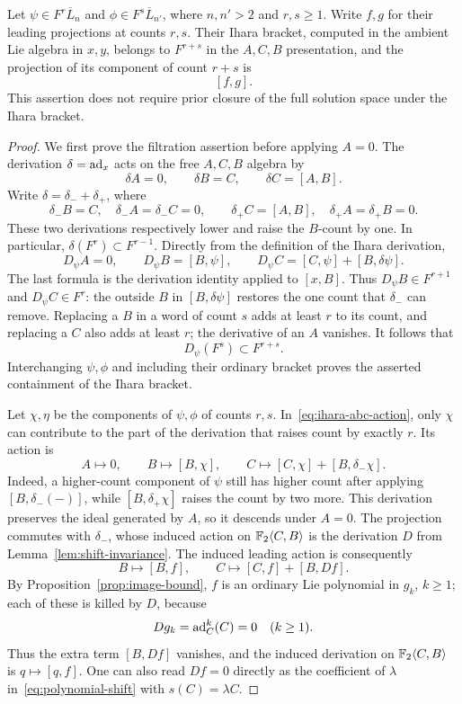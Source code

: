 \begin{proposition}
\label{prop:leading-ihara}
Let $\psi\in F^r\overline L_n$ and
$\phi\in F^s\overline L_{n'}$, where $n,n'>2$ and $r,s\geq1$.
Write $f,g$ for their leading projections at counts $r,s$.
Their Ihara bracket, computed in the ambient Lie algebra in
$x,y$, belongs to $F^{r+s}$ in the $A,C,B$ presentation, and
the projection of its component of count $r+s$ is
\begin{equation}
 \label{eq:leading-ihara}
 [f,g].
\end{equation}
This assertion does not require prior closure of the full solution
space under the Ihara bracket.
\end{proposition}

\begin{proof}
We first prove the filtration assertion before applying $A=0$.
The derivation $\delta=\operatorname{ad}_x$ acts on the free $A,C,B$ algebra by
\[
 \delta A=0,\qquad \delta B=C,\qquad \delta C=[A,B].
\]
Write $\delta=\delta_-+\delta_+$, where
\[
 \delta_-B=C,\quad \delta_-A=\delta_-C=0,
 \qquad
 \delta_+C=[A,B],\quad \delta_+A=\delta_+B=0.
\]
These two derivations respectively lower and raise the $B$-count
by one.  In particular, $\delta(F^r)\subset F^{r-1}$.
Directly from the definition of the Ihara derivation,
\begin{equation}
 \label{eq:ihara-abc-action}
 D_\psi A=0,\qquad
 D_\psi B=[B,\psi],\qquad
 D_\psi C=[C,\psi]+[B,\delta\psi].
\end{equation}
The last formula is the derivation identity applied to $[x,B]$.
Thus $D_\psi B\in F^{r+1}$ and $D_\psi C\in F^r$:
the outside $B$ in $[B,\delta\psi]$ restores the one count that
$\delta_-$ can remove.  Replacing a $B$ in a word of count $s$
adds at least $r$ to its count, and replacing a $C$ also adds at
least $r$; the derivative of an $A$ vanishes.
It follows that
\[
 D_\psi(F^s)\subset F^{r+s}.
\]
Interchanging $\psi,\phi$ and including their ordinary bracket
proves the asserted containment of the Ihara bracket.

Let $\chi,\eta$ be the components of $\psi,\phi$ of counts
$r,s$.  In~\eqref{eq:ihara-abc-action}, only $\chi$ can contribute
to the part of the derivation that raises count by exactly $r$.
Its action is
\[
 A\longmapsto0,\qquad
 B\longmapsto[B,\chi],\qquad
 C\longmapsto[C,\chi]+[B,\delta_-\chi].
\]
Indeed, a higher-count component of $\psi$ still has higher count
after applying $[B,\delta_-(-)]$, while
$[B,\delta_+\chi]$ raises the count by two more.
This derivation preserves the ideal generated by $A$, so it
descends under $A=0$.
The projection commutes with $\delta_-$, whose induced action
on ${\mathbb F_2}\langle C,B\rangle$ is the derivation $D$ from
Lemma~\ref{lem:shift-invariance}.
The induced leading action is consequently
\[
 B\longmapsto[B,f],\qquad
 C\longmapsto[C,f]+[B,Df].
\]
By Proposition~\ref{prop:image-bound}, $f$ is an ordinary Lie
polynomial in $g_k$, $k\geq1$; each of these is killed by $D$,
because
\[
 Dg_k=\operatorname{ad}_C^k(C)=0\quad(k\geq1).
\]
Thus the extra term $[B,Df]$ vanishes, and the induced derivation
on ${\mathbb F_2}\langle C,B\rangle$ is $q\mapsto[q,f]$.
One can also read $Df=0$ directly as the coefficient of $\lambda$
in~\eqref{eq:polynomial-shift} with $s(C)=\lambda C$.


\end{proof}
